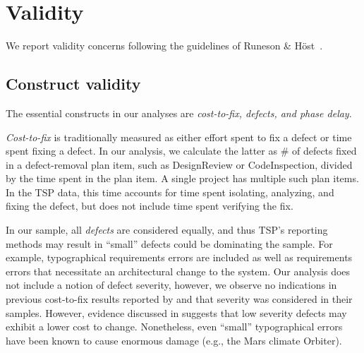 \documentclass{sig-alternate}
\def\baselinestretch{1}
\begin{document}
%


 


 

\section{Validity} 
We report validity concerns following the guidelines of Runeson \& H\"{o}st~\cite{runeson09}.

\subsection{Construct validity}
The essential constructs in our analyses are \emph{cost-to-fix, defects, and phase delay}. 

\emph{Cost-to-fix} is traditionally measured as either effort spent to fix a defect or time spent fixing a defect. In our analysis, we calculate the latter as \# of defects fixed in a defect-removal plan item, such as DesignReview or CodeInspection, divided by the time spent in the plan item. A single project has multiple such plan items. In the TSP data, this time accounts for time spent isolating, analyzing, and fixing the defect, but does not include time spent verifying the fix.

In our sample, all \emph{defects} are considered equally, and thus TSP's reporting methods may result in ``small'' defects could be dominating the sample. For example, typographical requirements errors are included as well as requirements errors that necessitate an architectural change to the system. Our analysis does not include a notion of defect severity, however, we observe no indications in previous cost-to-fix results reported by \cite{Boehm81} and \cite{Royce98} that severity was considered in their samples. However, evidence discussed in \cite{Shull02} suggests that low severity defects may exhibit a lower cost to change. Nonetheless, even ``small'' typographical errors have been known to cause enormous damage (e.g., the Mars climate Orbiter). 
\end{document}
